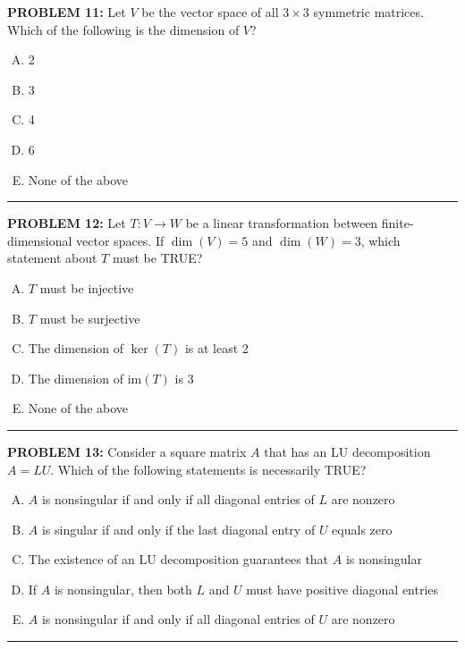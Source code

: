 \documentclass[12pt]{amsart}
\newcommand{\divider}{
  \vspace{-1em} %
  \noindent
  \raisebox{-0.15ex}{\textbullet}%
  \hspace{0.5em}%
  \rule[0.5ex]{0.95\textwidth}{1.0pt}%
  \hspace{0.5em}%
  \raisebox{-0.15ex}{\textbullet}%
  \vspace{0em} %
}
\begin{document}
\newpage

{\bf PROBLEM 11:}
Let $V$ be the vector space of all $3 \times 3$ symmetric matrices. Which of the following is the dimension of $V$?

\begin{enumerate}[(A)]
\item 2
\item 3
\item 4
\item 6
\item None of the above
\end{enumerate}
\divider


{\bf PROBLEM 12:}
Let $T: V \to W$ be a linear transformation between finite-dimensional vector spaces. If $\dim(V) = 5$ and $\dim(W) = 3$, which statement about $T$ must be TRUE?

\begin{enumerate}[(A)]
\item $T$ must be injective
\item $T$ must be surjective
\item The dimension of $\ker(T)$ is at least 2
\item The dimension of $\text{im}(T)$ is 3
\item None of the above
\end{enumerate}
\divider



{\bf PROBLEM 13:}
Consider a square matrix $A$ that has an LU decomposition $A = LU$. Which of the following statements is necessarily TRUE?

\begin{enumerate}[(A)]
\item $A$ is nonsingular if and only if all diagonal entries of $L$ are nonzero
\item $A$ is singular if and only if the last diagonal entry of $U$ equals zero
\item The existence of an LU decomposition guarantees that $A$ is nonsingular
\item If $A$ is nonsingular, then both $L$ and $U$ must have positive diagonal entries
\item $A$ is nonsingular if and only if all diagonal entries of $U$ are nonzero
\end{enumerate}
\divider
\end{document}
